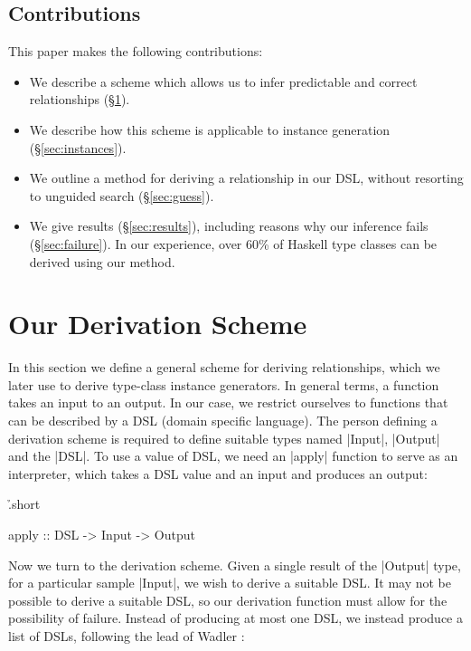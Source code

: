 \documentclass{llncs}
\newcommand\citet\cite
\begin{document}
\subsection{Contributions}

This paper makes the following contributions:

\begin{itemize}
\item We describe a scheme which allows us to infer predictable and correct relationships (\S\ref{sec:scheme}).
\item We describe how this scheme is applicable to instance generation (\S\ref{sec:instances}).
\item We outline a method for deriving a relationship in our DSL, without resorting to unguided search (\S\ref{sec:guess}).
\item We give results (\S\ref{sec:results}), including reasons why our inference fails (\S\ref{sec:failure}). In our experience, over 60\% of Haskell type classes can be derived using our method.
\end{itemize}

\section{Our Derivation Scheme}
\label{sec:scheme}

In this section we define a general scheme for deriving relationships, which we later use to derive type-class instance generators. In general terms, a function takes an input to an output. In our case, we restrict ourselves to functions that can be described by a DSL (domain specific language). The person defining a derivation scheme is required to define suitable types named |Input|, |Output| and the |DSL|. To use a value of DSL, we need an |apply| function to serve as an interpreter, which takes a DSL value and an input and produces an output:

\h{.short}\begin{code}
apply :: DSL -> Input -> Output
\end{code}

Now we turn to the derivation scheme. Given a single result of the |Output| type, for a particular sample |Input|, we wish to derive a suitable DSL. It may not be possible to derive a suitable DSL, so our derivation function must allow for the possibility of failure. Instead of producing at most one DSL, we instead produce a list of DSLs, following the lead of Wadler \citet{wadler:list_of_successes}:
\end{document}
